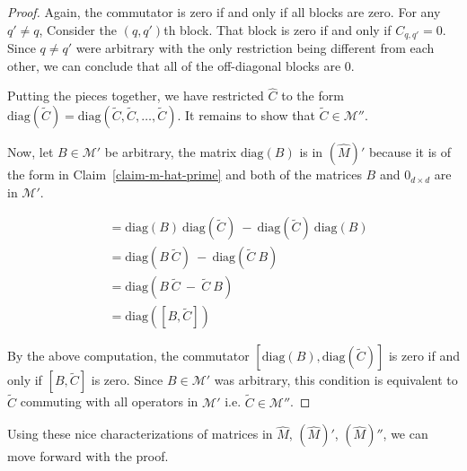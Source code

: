 \begin{proof}
Again, the commutator is zero if and only if all blocks are zero. For any $q' \neq q$, Consider the $(q, q')$th block. That block is zero if and only if $C_{q,q'} = 0$. Since $q \neq q'$ were arbitrary with the only restriction being different from each other, we can conclude that all of the off-diagonal blocks are $0$.

Putting the pieces together, we have restricted $\widehat{C}$ to the form $\text{diag}(\widetilde{C}) = \text{diag}(\widetilde{C}, \widetilde{C}, \dots, \widetilde{C})$. It remains to show that $\widetilde{C} \in \mathcal{M}''$.

Now, let $B \in \mathcal{M}'$ be arbitrary, the matrix $\text{diag}(B)$ is in $(\widehat{M})'$ because it is of the form in Claim~\ref{claim-m-hat-prime} and both of the matrices $B$ and $0_{d\times d}$ are in $\mathcal{M}'$.

\begin{align*}
    [\text{diag}(B), \text{diag}(\widetilde{C})] &= \text{diag}(B) \ \text{diag}(\widetilde{C}) \ - \ \text{diag}(\widetilde{C}) \ \text{diag}(B) \\
    &= \text{diag}(B\ \widetilde{C}) \ -  \ \text{diag}( \widetilde{C} \ B)\\
    &= \text{diag}(B\ \widetilde{C}\ -  \ \widetilde{C} \ B)\\
    &= \text{diag}([B, \widetilde{C}])
\end{align*}

By the above computation, the commutator $[\text{diag}(B), \text{diag}(\widetilde{C})]$ is zero if and only if $[B, \widetilde{C}]$ is zero. Since $B \in \mathcal{M}'$ was arbitrary, this condition is equivalent to $\widetilde{C}$ commuting with all operators in $\mathcal{M}'$  i.e. $\widetilde{C} \in \mathcal{M}''$.


\end{proof}
Using these nice characterizations of matrices in $\widehat{M}$, $(\widehat{M})'$, $(\widehat{M})''$, we can move forward with the proof.

